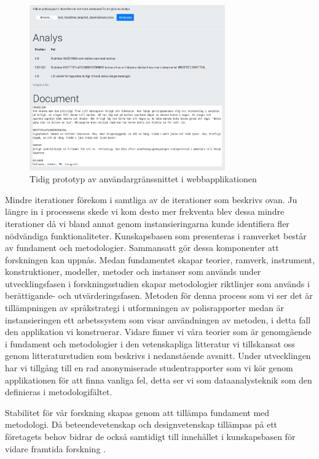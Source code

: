 \documentclass[swedish]{maucsthesis}
\begin{document}
\begin{figure}[H]
    \centering
    \includegraphics[width=0.75\textwidth]{tidigprototyp.png}
    \caption{Tidig prototyp av användargränssnittet i webbapplikationen}
    \label{fig:tidigprototyp}
\end{figure}

Mindre iterationer förekom i samtliga av de iterationer som beskrivs ovan. Ju
längre in i processens skede vi kom desto mer frekventa blev dessa mindre
iterationer då vi bland annat genom instansieringarna kunde identifiera fler
nödvändiga funktionaliteter. Kunskapsbasen som presenteras i ramverket består av
fundament och metodologier. Sammansatt gör dessa komponenter att forskningen kan
uppnås. Medan fundamentet skapar teorier, ramverk, instrument, konstruktioner,
modeller, metoder och instanser som används under utvecklingsfasen i
forskningsstudien skapar metodologier riktlinjer som används i berättigande- och
utvärderingsfasen. Metoden för denna process som vi ser det är tillämpningen av
språkstrategi i utformningen av polisrapporter medan är instansieringen ett
arbetssystem som visar användningen av metoden, i detta fall den applikation vi
konstruerar. Vidare finner vi våra teorier som är genomgående i fundament och
metodologier i den vetenskapliga litteratur vi tillskansat oss genom
litteraturstudien som beskrivs i nedanstående avsnitt. Under utvecklingen har vi
tillgång till en rad anonymiserade studentrapporter som vi kör genom
applikationen för att finna vanliga fel, detta ser vi som dataanalysteknik som
den definieras i metodologifältet.

Stabilitet för vår forskning skapas genom att tillämpa fundament med metodologi.
Då beteendevetenskap och designvetenskap tillämpas på ett företagets behov
bidrar de också samtidigt till innehållet i kunskapsbasen för vidare framtida
forskning \cite{hevner:2004}.
\end{document}
